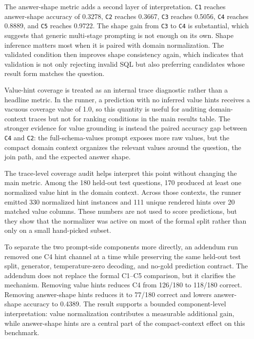 \documentclass{ieeeaccess}
\begin{document}
The answer-shape metric adds a second layer of interpretation. \texttt{C1} reaches answer-shape accuracy of 0.3278, \texttt{C2} reaches 0.3667, \texttt{C3} reaches 0.5056, \texttt{C4} reaches 0.8889, and \texttt{C5} reaches 0.9722. The shape gain from \texttt{C3} to \texttt{C4} is substantial, which suggests that generic multi-stage prompting is not enough on its own. Shape inference matters most when it is paired with domain normalization. The validated condition then improves shape consistency again, which indicates that validation is not only rejecting invalid SQL but also preferring candidates whose result form matches the question.

Value-hint coverage is treated as an internal trace diagnostic rather than a headline metric. In the runner, a prediction with no inferred value hints receives a vacuous coverage value of 1.0, so this quantity is useful for auditing domain-context traces but not for ranking conditions in the main results table. The stronger evidence for value grounding is instead the paired accuracy gap between \texttt{C4} and \texttt{C2}: the full-schema-values prompt exposes more raw values, but the compact domain context organizes the relevant values around the question, the join path, and the expected answer shape.

The trace-level coverage audit helps interpret this point without changing the main metric. Among the 180 held-out test questions, 170 produced at least one normalized value hint in the domain context. Across those contexts, the runner emitted 330 normalized hint instances and 111 unique rendered hints over 20 matched value columns. These numbers are not used to score predictions, but they show that the normalizer was active on most of the formal split rather than only on a small hand-picked subset.

To separate the two prompt-side components more directly, an addendum run removed one C4 hint channel at a time while preserving the same held-out test split, generator, temperature-zero decoding, and no-gold prediction contract. The addendum does not replace the formal C1--C5 comparison, but it clarifies the mechanism. Removing value hints reduces C4 from 126/180 to 118/180 correct. Removing answer-shape hints reduces it to 77/180 correct and lowers answer-shape accuracy to 0.4389. The result supports a bounded component-level interpretation: value normalization contributes a measurable additional gain, while answer-shape hints are a central part of the compact-context effect on this benchmark.
\end{document}
